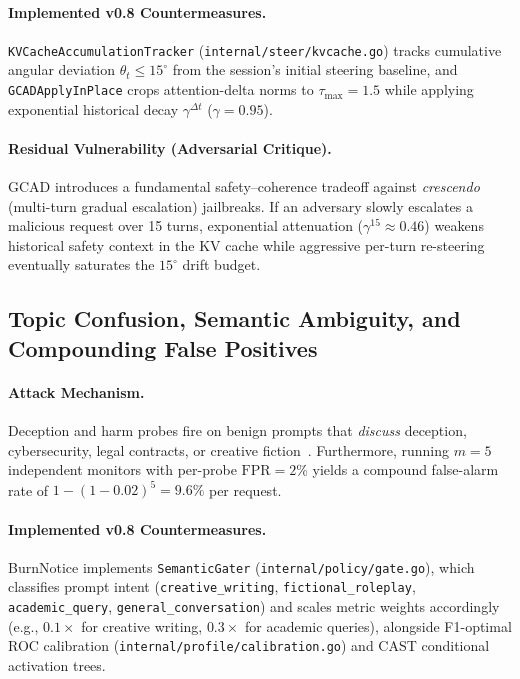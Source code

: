 \documentclass{article}
\begin{document}
\paragraph{Implemented v0.8 Countermeasures.}
\texttt{KVCacheAccumulationTracker} (\texttt{internal/steer/kvcache.go}) tracks cumulative angular deviation $\theta_t \le 15^\circ$ from the session's initial steering baseline, and \texttt{GCADApplyInPlace} crops attention-delta norms to $\tau_{\max} = 1.5$ while applying exponential historical decay $\gamma^{\Delta t}$ ($\gamma = 0.95$).

\paragraph{Residual Vulnerability (Adversarial Critique).}
GCAD introduces a fundamental safety--coherence tradeoff against \textit{crescendo} (multi-turn gradual escalation) jailbreaks. If an adversary slowly escalates a malicious request over 15 turns, exponential attenuation ($\gamma^{15} \approx 0.46$) weakens historical safety context in the KV cache while aggressive per-turn re-steering eventually saturates the $15^\circ$ drift budget.

\subsection{Topic Confusion, Semantic Ambiguity, and Compounding False Positives}
\paragraph{Attack Mechanism.}
Deception and harm probes fire on benign prompts that \textit{discuss} deception, cybersecurity, legal contracts, or creative fiction~\cite{goldowskydill2025detecting, blandfort2026redteaming}. Furthermore, running $m=5$ independent monitors with per-probe $\text{FPR} = 2\%$ yields a compound false-alarm rate of $1 - (1 - 0.02)^5 = 9.6\%$ per request.

\paragraph{Implemented v0.8 Countermeasures.}
BurnNotice implements \texttt{SemanticGater} (\texttt{internal/policy/gate.go}), which classifies prompt intent (\texttt{creative\_writing}, \texttt{fictional\_roleplay}, \texttt{academic\_query}, \texttt{general\_conversation}) and scales metric weights accordingly (e.g., $0.1\times$ for creative writing, $0.3\times$ for academic queries), alongside F1-optimal ROC calibration (\texttt{internal/profile/calibration.go}) and CAST conditional activation trees.
\end{document}
